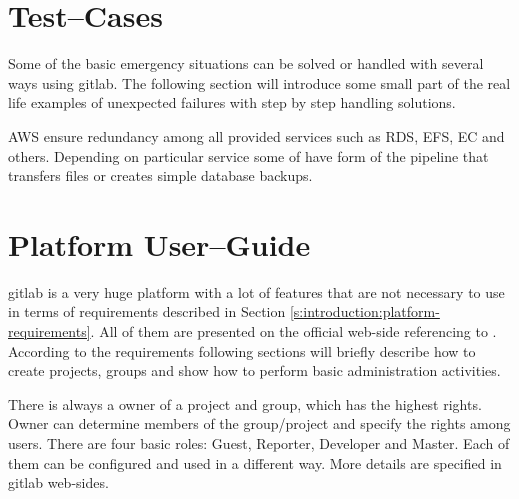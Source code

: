 \chapter{Test--Cases} \label{chp:test-cases}
	Some of the basic emergency situations can be solved or handled with several ways using \gls{gitlab}. The following section will introduce some small part of the real life examples of unexpected failures with step by step handling solutions.
	
	\gls{AWS} ensure redundancy among all provided services such as \gls{RDS}, \gls{EFS}, \gls{EC} and others. Depending on particular service some of have form of the pipeline that transfers files or creates simple database backups.
	
	
%	
\chapter{Platform User--Guide} \label{chp:platform-user-guide}
	\gls{gitlab} is a very huge platform with a lot of features that are not necessary to use in terms of requirements described in Section \ref{s:introduction:platform-requirements}. All of them are presented on the official web-side referencing to \cite{bib:gitlabce-documentation-overview}. According to the requirements following sections will briefly describe how to create projects, groups and show how to perform basic administration activities. 	
	
	There is always a owner of a project and group, which has the highest rights. Owner can determine members of the group/project and specify the rights among users. There are four basic roles: Guest, Reporter, Developer and Master. Each of them can be configured and used in a different way. More details are specified in \gls{gitlab} web-sides.
	
	
	
